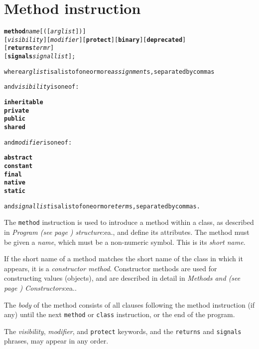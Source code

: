 \chapter{Method instruction}\label{"id"}
\index{,}
\index{,}
\begin{shaded}
\begin{alltt}
\textbf{method} \emph{name}[([\emph{arglist}])]
               [\emph{visibility}] [\emph{modifier}] [\textbf{protect}] [\textbf{binary}] [\textbf{deprecated}]
               [\textbf{returns} \emph{termr}]
               [\textbf{signals} \emph{signallist}];

where \emph{arglist} is a list of one or more \emph{assignment}s, separated by commas

and \emph{visibility} is one of:

    \textbf{inheritable}
    \textbf{private}
    \textbf{public}
    \textbf{shared}

and \emph{modifier} is one of:

    \textbf{abstract}
    \textbf{constant}
    \textbf{final}
    \textbf{native}
    \textbf{static}

and \emph{signallist} is a list of one or more \emph{term}s, separated by commas.
\end{alltt}
\end{shaded}
 The \texttt{method} instruction is used to introduce a method within
a class, as described in  \emph{Program (see page \pageref{refpstruct}) 
structure}:ea., and define its attributes.
The method must be given a \emph{name}, which must be a non-numeric
symbol.
This is its \emph{short name}.
 
If the short name of a method matches the short name of the class in
which it appears, it is a \emph{constructor method}.
Constructor methods are used for constructing values (objects), and are
described in detail in  \emph{Methods and (see page \pageref{refmethcon}) 
Constructors}:ea..
 
The \emph{body} of the method consists of all clauses following the
method instruction (if any) until the next \texttt{method} or
\texttt{class} instruction, or the end of the program.
 
The \emph{visibility}, \emph{modifier}, and \texttt{protect}
keywords, and the \texttt{returns} and \texttt{signals} phrases, may
appear in any order.
